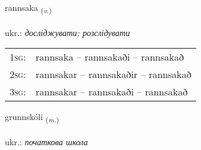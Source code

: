 \documentclass[frontgrid, backgrid]{flacards}\usepackage[]{graphicx}\usepackage[]{xcolor}
\begin{document}
\renewcommand{\flhead}{\vskip5pt \fboxsep=0pt {\small\bfseries\footnotesize Sagnorð | дієслово}}
\renewcommand{\fcfoot}{\vskip5pt \fboxsep=0pt \hspace{2pt}{\small\bfseries\footnotesize 2K}}

\renewcommand{\blhead}{\vskip5pt {\small\bfseries\footnotesize Sagnorð | дієслово }}
\renewcommand{\bcfoot}{\vskip5pt \hspace{2pt}{\small\bfseries\footnotesize 2K}}


{rannsaka \small{\textsubscript{(\textit{v.})}} \\[1ex] %
\textphonetic{[ransaka]} \\
ukr.: \emph{досліджувати; розслідувати} \\  [2ex]
\renewcommand*{\arraystretch}{0.8}
\begin{tabular}{p{1cm}l}
\textsc{1sg}: & rannsaka -- rannsakaði -- rannsakað \\ 
\textsc{2sg}: & rannsakar -- rannsakaðir -- rannsakað \\ 
\textsc{3sg}: & rannsakar -- rannsakaði -- rannsakað \\ 
\end{tabular}
}

\renewcommand{\flhead}{\vskip5pt \fboxsep=0pt {\small\bfseries\footnotesize Nafnorð | іменник}}
\renewcommand{\fcfoot}{\vskip5pt \fboxsep=0pt \hspace{2pt}{\small\bfseries\footnotesize 2K}}

\renewcommand{\blhead}{\vskip5pt {\small\bfseries\footnotesize Nafnorð | іменник }}
\renewcommand{\bcfoot}{\vskip5pt \hspace{2pt}{\small\bfseries\footnotesize 2K}}


{grunnskóli \small{\textsubscript{(\textit{m.})}} \\[1ex] %
\textphonetic{[krʏnskoulɪ]} \\
ukr.: \emph{початкова школа} \\  [2ex]
\renewcommand*{\arraystretch}{0.8}
}
\end{document}
